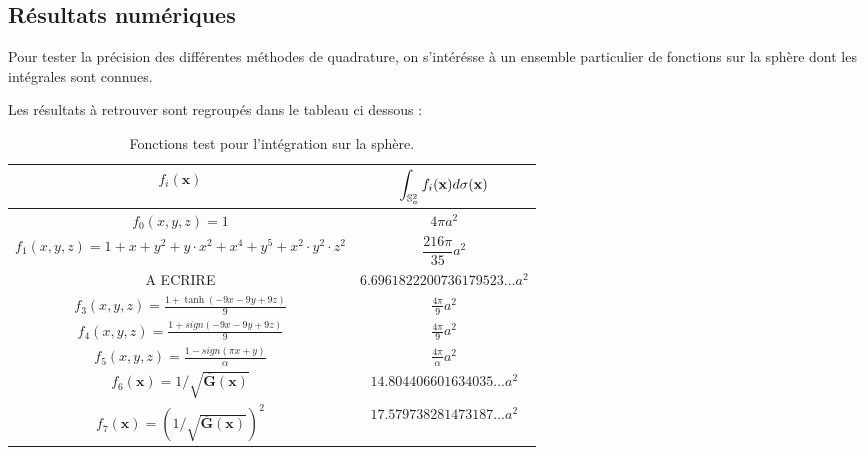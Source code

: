 \subsection{Résultats numériques} %

Pour tester la précision des différentes méthodes de quadrature, on s'intérésse à un ensemble particulier de fonctions sur la sphère dont les intégrales sont connues.

Les résultats à retrouver sont regroupés dans le tableau ci dessous :

\begin{table}
\begin{center}
\begin{tabular}{|c|c|}
\hline
$f_i(\mathbf{x})$   &   $\displaystyle\int_{\mathbb{S}_a^2} f_i(\mathbf{x}) d\sigma (\mathbf{x})$ \\
\hline
\hline
$f_0(x,y,z)=1$ & $4 \pi a^2$ \\
\hline
$f_1(x,y,z)=1+x+y^2+y\cdot x^2+x^4+y^5+x^2 \cdot y^2 \cdot z^2$ & $\dfrac{216 \pi}{35} a^2$ \\
\hline
A ECRIRE & $6.6961822200736179523...  a^2$ \\
\hline
$f_3(x,y,z)=\frac{1+\tanh(-9x-9y+9z)}{9}$ & $\frac{4\pi}{9} a^2$\\
\hline
$f_4(x,y,z)=\frac{1+sign(-9x-9y+9z)}{9}$ & $\frac{4\pi}{9} a^2$\\
\hline
$f_5(x,y,z)=\frac{1-sign(\pi x + y)}{\alpha}$ & $\frac{4\pi}{\alpha} a^2$ \\
\hline
$f_6(\mathbf{x}) = 1/\sqrt{\overline{\mathbf{G}}(\mathbf{x})}$ & $14.804406601634035... a^2$ \\
\hline
$f_7(\mathbf{x}) = (1/\sqrt{\overline{\mathbf{G}}(\mathbf{x})})^2$ & $17.579738281473187... a^2$ \\
\hline
\end{tabular}
\end{center}
\caption{Fonctions test pour l'intégration sur la sphère.}
\end{table}




























